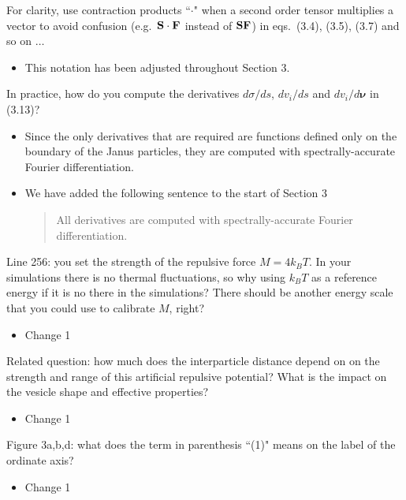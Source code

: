 \documentclass[11pt]{article}
\newcommand{\comment}[1]{{\color{blue} #1}}
\begin{document}
\noindent
\comment{For clarity, use contraction products ``$\cdot$" when a second
order tensor multiplies a vector to avoid confusion (e.g.~${\bf S} \cdot
{\bf F}$ instead of ${\bf SF}$) in eqs.~(3.4), (3.5), (3.7) and so on
$\ldots$}
\begin{itemize}
  \item This notation has been adjusted throughout Section 3.
\end{itemize}

\noindent
\comment{In practice, how do you compute the derivatives $d\sigma /ds$,
$dv_i/ds$ and $dv_i/d\boldsymbol{\nu}$ in (3.13)?}
\begin{itemize}
  \item Since the only derivatives that are required are functions
    defined only on the boundary of the Janus particles, they are
    computed with spectrally-accurate Fourier differentiation.

  \item We have added the following sentence to the start of Section 3
    \begin{quotation}
      All derivatives are computed with spectrally-accurate Fourier
      differentiation.
    \end{quotation}
\end{itemize}

\noindent
\comment{Line 256: you set the strength of the repulsive force $M = 4k_B
T$. In your simulations there is no thermal fluctuations, so why using
$k_B T$ as a reference energy if it is no there in the simulations?
There should be another energy scale that you could use to calibrate
$M$, right?}
\begin{itemize}
  \item Change 1 
\end{itemize}

\noindent
\comment{Related question: how much does the interparticle distance
depend on on the strength and range of this artificial repulsive
potential? What is the impact on the vesicle shape and effective
properties?}
\begin{itemize}
  \item Change 1 
\end{itemize}

\noindent
\comment{Figure 3a,b,d: what does the term in parenthesis ``(1)" means
on the label of the ordinate axis?}
\begin{itemize}
  \item Change 1 
\end{itemize}
\end{document}
